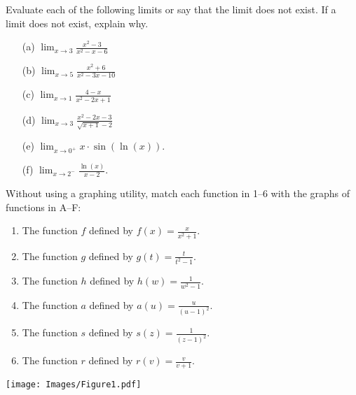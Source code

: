\documentclass[handout,nooutcomes]{ximera}
\begin{document}
\begin{problem}
  \label{problem:evaluate-infinite-limits}
  Evaluate each of the following limits or say that the limit does not exist.
  If a limit does not exist, explain why.
  \begin{itemize}
    \item[(a)]
      $\displaystyle \lim_{x \to 3} \frac{x^2 - 3}{x^2 - x - 6}$

    \item[(b)]
      $\displaystyle \lim_{x \to 5} \frac{x^2 + 6}{x^2 - 3x - 10}$

    \item[(c)]
      $\displaystyle \lim_{x \to 1} \frac{4-x}{x^2 - 2x + 1}$

    \item[(d)]
      $\displaystyle \lim_{x \to 3} \frac{x^2 - 2x - 3}{\sqrt{x+1} - 2}$

    \item[(e)]
      $\displaystyle \lim_{x \to 0^+} x \cdot \sin(\ln(x))$.

    \item[(f)]
      $\displaystyle \lim_{x \to 2^-} \frac{\ln(x)}{x - 2}$.
  \end{itemize}  
\end{problem}

\begin{problem}
  \label{problem:evaluate-infinite-limits-AU15-exam1}
    Without using a graphing utility, match each function in 1--6 with the graphs of functions in A--F:
  \begin{enumerate}
    \item
      The function $f$ defined by $\displaystyle f(x) = \frac{x}{x^2 + 1}$.

    \item 
      The function $g$ defined by $\displaystyle g(t) = \frac{t}{t^2 -1}$.

    \item 
      The function $h$ defined by $\displaystyle h(w) = \frac{1}{w^2 -1}$.

    \item 
      The function $a$ defined by $\displaystyle a(u) = \frac{u}{(u-1)^2}$.

    \item 
      The function $s$ defined by $\displaystyle s(z) = \frac{1}{(z-1)^2}$.

    \item
      The function $r$ defined by $\displaystyle r(v) = \frac{v}{v+1}$.
  \end{enumerate}
  \begin{center}
    \texttt{[image: Images/Figure1.pdf]}
  \end{center}
\end{problem}
\end{document}
